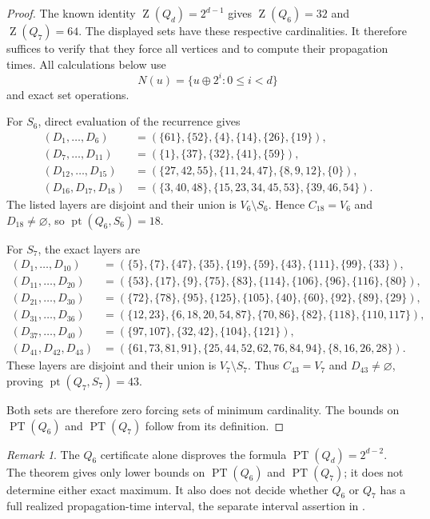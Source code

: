 \documentclass[11pt]{amsart}
\theoremstyle{remark}
\newtheorem*{remark}{Remark}
\DeclareMathOperator{\pt}{pt}
\DeclareMathOperator{\PT}{PT}
\DeclareMathOperator{\Z}{Z}
\begin{document}
\begin{proof}
The known identity $\Z(Q_d)=2^{d-1}$
\cite[Theorem~3.1]{AIM} gives $\Z(Q_6)=32$ and $\Z(Q_7)=64$.
The displayed sets have these respective cardinalities. It therefore
suffices to verify that they force all vertices and to compute their
propagation times. All calculations below use
\[
N(u)=\{u\mathbin{\oplus}2^i:0\le i<d\}
\]
and exact set operations.

For $S_6$, direct evaluation of the recurrence gives
\begin{align*}
(D_1,\ldots,D_6)
 &= (\{61\},\{52\},\{4\},\{14\},\{26\},\{19\}),\\
(D_7,\ldots,D_{11})
 &= (\{1\},\{37\},\{32\},\{41\},\{59\}),\\
(D_{12},\ldots,D_{15})
 &= (\{27,42,55\},\{11,24,47\},\{8,9,12\},\{0\}),\\
(D_{16},D_{17},D_{18})
 &= (\{3,40,48\},\{15,23,34,45,53\},\{39,46,54\}).
\end{align*}
The listed layers are disjoint and their union is $V_6\setminus S_6$.
Hence $C_{18}=V_6$ and $D_{18}\ne\varnothing$, so
$\pt(Q_6,S_6)=18$.

For $S_7$, the exact layers are
\begin{align*}
(D_1,\ldots,D_{10})
 &= (\{5\},\{7\},\{47\},\{35\},\{19\},\{59\},\{43\},
     \{111\},\{99\},\{33\}),\\
(D_{11},\ldots,D_{20})
 &= (\{53\},\{17\},\{9\},\{75\},\{83\},\{114\},\{106\},
     \{96\},\{116\},\{80\}),\\
(D_{21},\ldots,D_{30})
 &= (\{72\},\{78\},\{95\},\{125\},\{105\},\{40\},\{60\},
     \{92\},\{89\},\{29\}),\\
(D_{31},\ldots,D_{36})
 &= (\{12,23\},\{6,18,20,54,87\},\{70,86\},\{82\},
     \{118\},\{110,117\}),\\
(D_{37},\ldots,D_{40})
 &= (\{97,107\},\{32,42\},\{104\},\{121\}),\\
(D_{41},D_{42},D_{43})
 &= (\{61,73,81,91\},\{25,44,52,62,76,84,94\},
     \{8,16,26,28\}).
\end{align*}
These layers are disjoint and their union is $V_7\setminus S_7$.
Thus $C_{43}=V_7$ and $D_{43}\ne\varnothing$, proving
$\pt(Q_7,S_7)=43$.

Both sets are therefore zero forcing sets of minimum cardinality. The
bounds on $\PT(Q_6)$ and $\PT(Q_7)$ follow from its definition.
\end{proof}

\begin{remark}
The $Q_6$ certificate alone disproves the formula
$\PT(Q_d)=2^{d-2}$. The theorem gives only lower bounds on
$\PT(Q_6)$ and $\PT(Q_7)$; it does not determine either exact maximum.
It also does not decide whether $Q_6$ or $Q_7$ has a full realized
propagation-time interval, the separate interval assertion in
\cite[Conjecture~4.4]{BCG}.
\end{remark}
\end{document}

